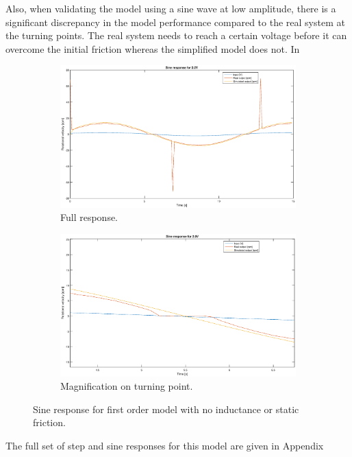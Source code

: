 Also, when validating the model using a sine wave at low amplitude, there is a
significant discrepancy in the model performance compared to the real system at
the turning points. The real system needs to reach a certain voltage before it
can overcome the initial friction whereas the simplified model does not. In 
\begin{figure}[H]
    \centering
    \begin{subfigure}[H]{0.48\textwidth}
    \includegraphics[width=\textwidth]{./img/testrig_2Vsine_no_i_no_fric.eps}
    \caption{Full response.}\label{fig:1storder_sine2}
    \end{subfigure}
    \begin{subfigure}[H]{0.48\textwidth}
    \includegraphics[width=\textwidth]{./img/testrig_2Vsine_no_i_no_fric_zoom.eps}
    \caption{Magnification on turning point.}\label{fig:1storder_sine2z}
    \end{subfigure}
    \caption{Sine response for first order model with no inductance or static
    friction.}
\end{figure}
The full set of step and sine responses for this model are given in Appendix %

